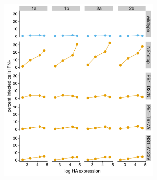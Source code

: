 \documentclass[]{asm-article}
\newcommand{\FIG}[1]{\autoref{fig:#1}}
\newcommand{\SUPPFIG}[1]{\autoref{suppfig:#1}}
\begin{document}
\begin{suppfig}
\centerline{
\includegraphics[width=0.6\textwidth, valign=t]{figures/MutantComparison/p_ifn_vs_ha.pdf}
}
\caption{
A more detailed version of the data summarized in \FIG{IFN_vs_HA}.
For each virus and replicate, we binned the infected cells in \SUPPFIG{validationflow} into HA expression quartiles based on the flow cytometry measurements.
We then calculated the percent of cells that were IFN+ in each quartile.
The plots show the mean HA expression of the quartile versus the precent of cells that are IFN+.
The results clearly show that for the NS1stop and to a lesser extent the NS1-A122V variants, more viral protein (higher HA signal) correlates with IFN induction.
\FIG{IFN_vs_HA} summarizes these same data by simply showing the ratio of percent IFN+ between the highest and lowest quartile.
}
\label{suppfig:IFN_vs_HA}
\end{suppfig}

\clearpage

\begin{suppfile}
\caption{
Sequences of the IFN reporters in \FIG{IFNrare}A are at \url{https://github.com/jbloomlab/IFNsorted_flu_single_cell/tree/master/paper/figures/IFN_stochastic/IFN_reporter/plasmids}.
This file is also available on Data Dryad Digital Repository at \url{https://doi.org/10.5061/dryad.nh053c6}.
}
\label{suppfile:reporter_sequences}
\end{suppfile}

\begin{suppfile}
\caption{
Genbank files giving sequences of the wild-type and synonymously barcoded viruses are at \url{https://github.com/jbloomlab/IFNsorted_flu_single_cell/blob/master/data/flu_sequences/flu-wsn.gb} and \url{https://github.com/jbloomlab/IFNsorted_flu_single_cell/blob/master/data/flu_sequences/flu-wsn-double-syn.gb}.
This file is also available on Data Dryad Digital Repository at \url{https://doi.org/10.5061/dryad.nh053c6}.
}
\label{suppfile:virus_seqs}
\end{suppfile}
\end{document}
